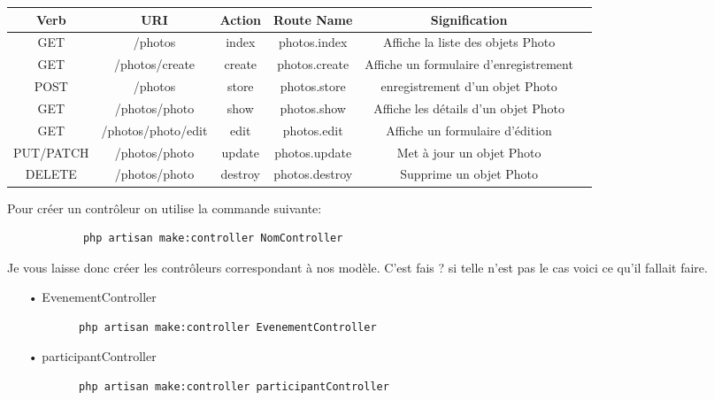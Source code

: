 \documentclass[12pt,a4paper]{article}
\begin{document}
\begin{center}
\begin{tabular}{|c|c|c|c|c|c|}
\hline 
Verb & URI & Action & Route Name & Signification \\ 
\hline 
GET & /photos & index & photos.index & Affiche la liste des objets Photo \\ 
\hline 
GET & /photos/create & create & photos.create & Affiche un formulaire d'enregistrement \\ 
\hline 
POST & /photos & store & photos.store & enregistrement d'un objet Photo\\ 
\hline 
GET & /photos/{photo} & show & photos.show & Affiche les détails d'un objet Photo \\ 
\hline 
GET & /photos/{photo}/edit & edit & photos.edit & Affiche un formulaire d'édition \\ 
\hline 
PUT/PATCH & /photos/{photo} & update & photos.update & Met à jour un objet Photo \\ 
\hline 
DELETE & /photos/{photo} & destroy & photos.destroy & Supprime un objet Photo \\ 
\hline 
\end{tabular} 
\end{center}



Pour créer un contrôleur on utilise la commande suivante:
\begin{verbatim}
            php artisan make:controller NomController
\end{verbatim}



Je vous laisse donc créer les contrôleurs correspondant à nos modèle. C'est fais ?
si telle n'est pas le cas voici ce qu'il fallait faire.\\

\begin{itemize}

\item[•] EvenementController\\

\begin{verbatim}
        php artisan make:controller EvenementController
\end{verbatim}

\item[•] participantController\\

\begin{verbatim}
        php artisan make:controller participantController
\end{verbatim}

\end{itemize}
\end{document}
